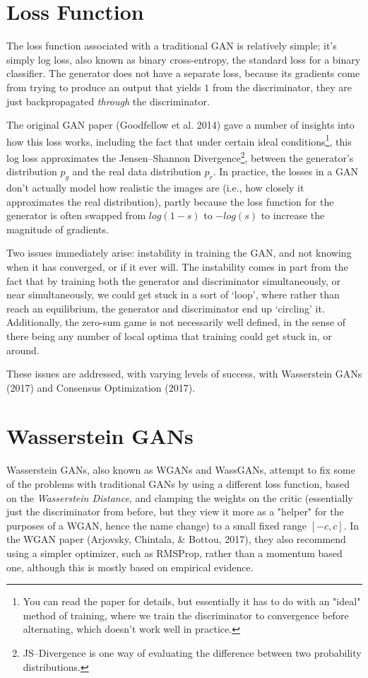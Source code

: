 \documentclass{article}
\begin{document}
\section{Loss Function}

The loss function associated with a traditional GAN is relatively simple; it's simply log loss, also known as binary cross-entropy, the standard loss for a binary classifier. The generator does not have a separate loss, because its gradients come from trying to produce an output that yields $1$ from the discriminator, they are just backpropagated \textit{through} the discriminator.

The original GAN paper (Goodfellow et al. 2014) gave a number of insights into how this loss works, including the fact that under certain ideal conditions\footnote{You can read the paper for details, but essentially it has to do with an "ideal" method of training, where we train the discriminator to convergence before alternating, which doesn't work well in practice.}, this log loss approximates the Jensen--Shannon Divergence\footnote{JS--Divergence is one way of evaluating the difference between two probability distributions.}, between the generator's distribution $p_g$ and the real data distribution $p_r$. In practice, the losses in a GAN don't actually model how realistic the images are (i.e., how closely it approximates the real distribution), partly because the loss function for the generator is often swapped from $log(1-s)$ to $-log(s)$ to increase the magnitude of gradients.

Two issues immediately arise: instability in training the GAN, and not knowing when it has converged, or if it ever will. The instability comes in part from the fact that by training both the generator and discriminator simultaneously, or near simultaneously, we could get stuck in a sort of `loop', where rather than reach an equilibrium, the generator and discriminator end up `circling' it. Additionally, the zero-sum game is not necessarily well defined, in the sense of there being any number of local optima that training could get stuck in, or around. 

These issues are addressed, with varying levels of success, with Wasserstein GANs (2017) and Consensus Optimization (2017).

\section{Wasserstein GANs}
Wasserstein GANs, also known as WGANs and WassGANs, attempt to fix some of the problems with traditional GANs by using a different loss function, based on the \textit{Wasserstein Distance}, and clamping the weights on the critic (essentially just the discriminator from before, but they view it more as a "helper" for the purposes of a WGAN, hence the name change) to a small fixed range $[-c, c]$. In the WGAN paper (Arjovsky, Chintala, & Bottou, 2017), they also recommend using a simpler optimizer, such as RMSProp, rather than a momentum based one, although this is mostly based on empirical evidence. 
\end{document}
